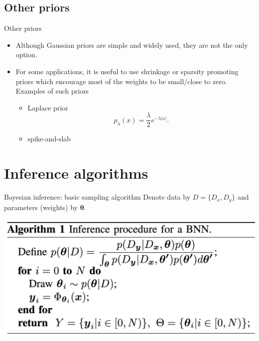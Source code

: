 \documentclass[9pt]{beamer}
\begin{document}
\subsection{Other priors}



\begin{frame}{Other priors}
\begin{itemize}
	\item Although Gaussian priors are simple and widely used, they are not the only option. 
	\item For some applications, it is useful to use shrinkage or sparsity promoting priors which encourage most of the weights to be small/close to zero. Examples of such priors
	\begin{itemize}
	 \item  Laplace prior
	$$p_\lambda(x) = \frac{\lambda}{2}e^{-\lambda|x|}.$$
		\item spike-and-slab
	\end{itemize}
\end{itemize}

\end{frame}






\section{Inference algorithms}
\begin{frame}
	
\end{frame}

\begin{frame}{Bayesian inference: basic sampling algorithm}
Denote data by $D=\{D_x,D_y\}$ and parameters (weights) by $\boldsymbol{\theta}$.
\begin{center}
	\includegraphics[width=.8\textwidth]{figures_julyan/bdl/hands-on/algo1}
\end{center}
\end{frame}
\end{document}
